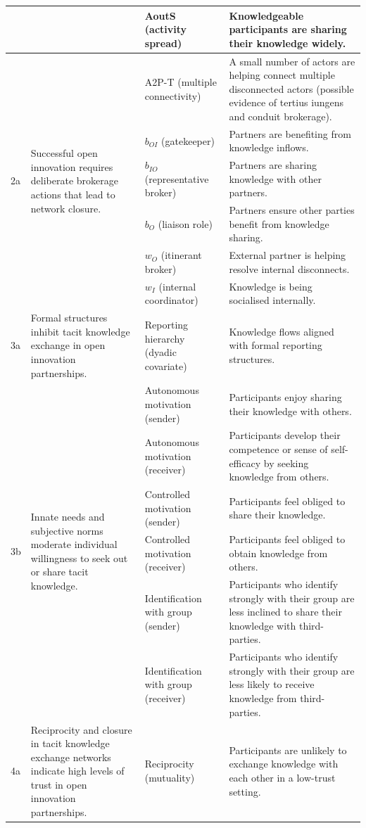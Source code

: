 \begin{table}
{\begin{tabular}{p{0.5cm} p{6cm} p{6cm} p{8cm}}
& & AoutS (activity spread) & Knowledgeable participants are sharing their knowledge widely. \\ \midrule
\multirow[t]{6}{=}{2a} & \multirow[t]{6}{=}{Successful open innovation requires deliberate brokerage actions that lead to network closure.} & A2P-T (multiple connectivity) & A small number of actors are helping connect multiple disconnected actors (possible evidence of tertius iungens and conduit brokerage). \\
& & $b_{OI}$ (gatekeeper) & Partners are benefiting from knowledge inflows. \\
& & $b_{IO}$ (representative broker) & Partners are sharing knowledge with other partners. \\
& & $b_O$ (liaison role) & Partners ensure other parties benefit from knowledge sharing. \\
& & $w_O$ (itinerant broker) & External partner is helping resolve internal disconnects. \\
& & $w_I$ (internal coordinator) & Knowledge is being socialised internally. \\ \midrule
3a & Formal structures inhibit tacit knowledge exchange in open innovation partnerships. & Reporting hierarchy (dyadic covariate) & Knowledge flows aligned with formal reporting structures. \\ \midrule
\multirow[t]{6}{=}{3b} & \multirow[t]{6}{=}{Innate needs and subjective norms moderate individual willingness to seek out or share tacit knowledge.} &
Autonomous motivation (sender) & Participants enjoy sharing their knowledge with others. \\
& & Autonomous motivation (receiver) & Participants develop their competence or sense of self-efficacy by seeking knowledge from others. \\
& & Controlled motivation (sender) & Participants feel obliged to share their knowledge. \\
& & Controlled motivation (receiver) & Participants feel obliged to obtain knowledge from others. \\
& & Identification with group (sender) & Participants who identify strongly with their group are less inclined to share their knowledge with third-parties. \\
& & Identification with group (receiver) & Participants who identify strongly with their group are less likely to receive knowledge from third-parties. \\ \midrule
\multirow[t]{3}{=}{4a} & \multirow[t]{3}{=}{Reciprocity and closure in tacit knowledge exchange networks indicate high levels of trust in open innovation partnerships.} & Reciprocity (mutuality) & Participants are unlikely to exchange knowledge with each other in a low-trust setting. \\

\end{tabular}}
\end{table}
